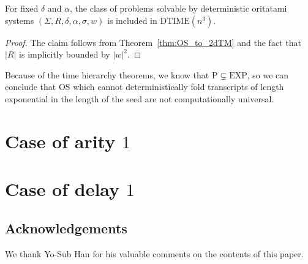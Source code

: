\documentclass[runningheads]{llncs}
\begin{document}
\begin{corollary}
	For fixed $\delta$ and $\alpha$, the class of problems solvable by deterministic oritatami systems $(\Sigma, R, \delta, \alpha, \sigma, w)$ is included in $\mathrm{DTIME}(n^3)$.
\end{corollary}
\begin{proof}
	The claim follows from Theorem~\ref{thm:OS_to_2dTM} and the fact that $|R|$ is implicitly bounded by $|w|^2$.
\end{proof}



Because of the time hierarchy theorems, we know that $\mathrm{P}\subsetneq \mathrm{EXP}$, so we can conclude that OS which cannot deterministically fold transcripts of length exponential in the length of the seed are not computationally universal.


\section{Case of arity $1$}





\section{Case of delay $1$}




\subsection*{Acknowledgements}
We thank Yo-Sub Han for his valuable comments on the contents of this paper. 



  
\end{document}
